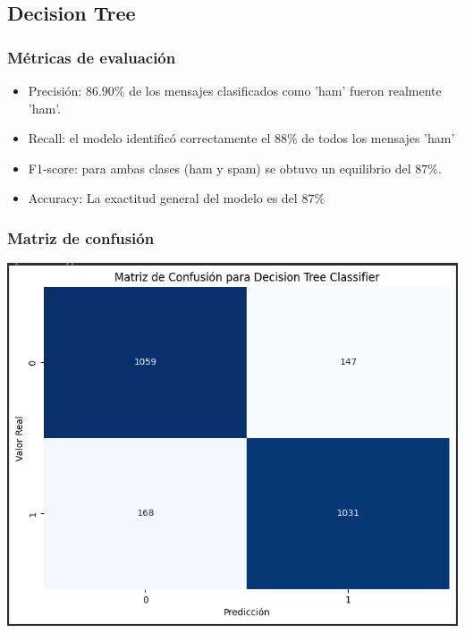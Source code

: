 \subsection{Decision Tree}


\subsubsection*{Métricas de evaluación}

\begin{itemize}
\item Precisión: $86.90\%$ de los mensajes clasificados como 'ham' fueron realmente 'ham'.
\item Recall: el modelo identificó correctamente el $88\%$ de todos los mensajes 'ham'
\item F1-score: para ambas clases (ham y spam) se obtuvo un equilibrio del $87\%$.
\item Accuracy: La exactitud general del modelo es del $87\%$
\end{itemize}

\subsubsection*{Matriz de confusión}

\begin{center}
    \includegraphics[scale = .4]{IMA/DecisionTreeMatriz.png}
\end{center}

